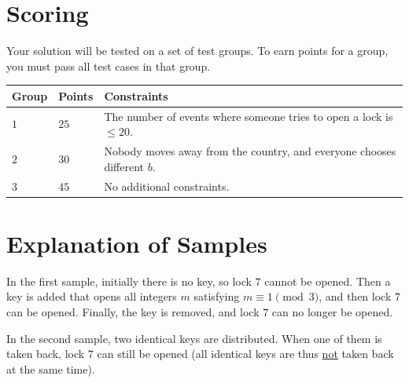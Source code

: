 \section*{Scoring}
Your solution will be tested on a set of test groups.
To earn points for a group, you must pass all test cases in that group.

\noindent
\begin{tabular}{| l | l | l |}
\hline
\textbf{Group} & \textbf{Points} & \textbf{Constraints} \\ \hline
$1$    & $25$         & The number of events where someone tries to open a lock is $\leq 20$. \\ \hline
$2$    & $30$         & Nobody moves away from the country, and everyone chooses different $b$. \\ \hline
$3$    & $45$         & No additional constraints. \\ \hline
\end{tabular}

\section*{Explanation of Samples}
In the first sample, initially there is no key, so lock $7$ cannot be opened. Then a key is added that opens all integers $m$ satisfying $m\equiv 1 \pmod{3}$, and then lock $7$ can be opened. Finally, the key is removed, and lock $7$ can no longer be opened.

In the second sample, two identical keys are distributed. When one of them is taken back, lock $7$ can still be opened (all identical keys are thus \underline{not} taken back at the same time).
